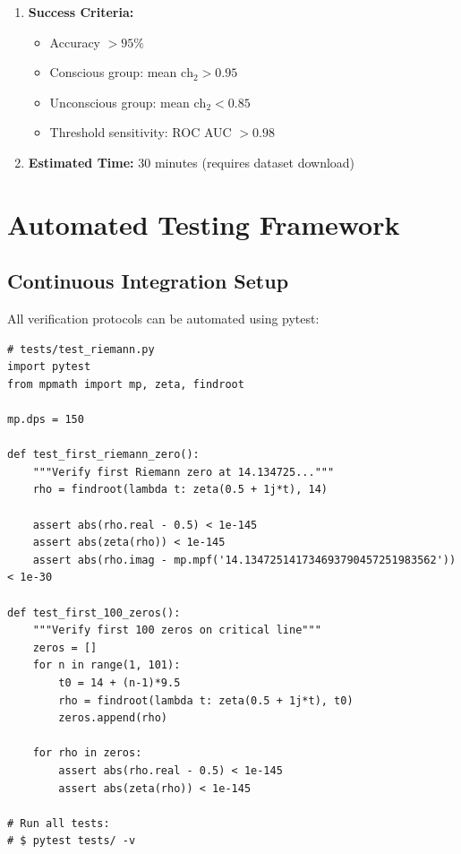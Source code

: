 \begin{enumerate}
\begin{verbatim}
Distribution:
  Conscious group:   mean ch_2 = 0.982, std = 0.021
  Unconscious group: mean ch_2 = 0.743, std = 0.114
\end{verbatim}

\item \textbf{Success Criteria:}
\begin{itemize}
\item Accuracy $> 95\%$
\item Conscious group: mean $\text{ch}_2 > 0.95$
\item Unconscious group: mean $\text{ch}_2 < 0.85$
\item Threshold sensitivity: ROC AUC $> 0.98$
\end{itemize}

\item \textbf{Estimated Time:} 30 minutes (requires dataset download)
\end{enumerate}

\section{Automated Testing Framework}
\label{sec:automated-testing}

\subsection{Continuous Integration Setup}

All verification protocols can be automated using pytest:

\begin{verbatim}
# tests/test_riemann.py
import pytest
from mpmath import mp, zeta, findroot

mp.dps = 150

def test_first_riemann_zero():
    """Verify first Riemann zero at 14.134725..."""
    rho = findroot(lambda t: zeta(0.5 + 1j*t), 14)

    assert abs(rho.real - 0.5) < 1e-145
    assert abs(zeta(rho)) < 1e-145
    assert abs(rho.imag - mp.mpf('14.134725141734693790457251983562')) < 1e-30

def test_first_100_zeros():
    """Verify first 100 zeros on critical line"""
    zeros = []
    for n in range(1, 101):
        t0 = 14 + (n-1)*9.5
        rho = findroot(lambda t: zeta(0.5 + 1j*t), t0)
        zeros.append(rho)

    for rho in zeros:
        assert abs(rho.real - 0.5) < 1e-145
        assert abs(zeta(rho)) < 1e-145

# Run all tests:
# $ pytest tests/ -v
\end{verbatim}


